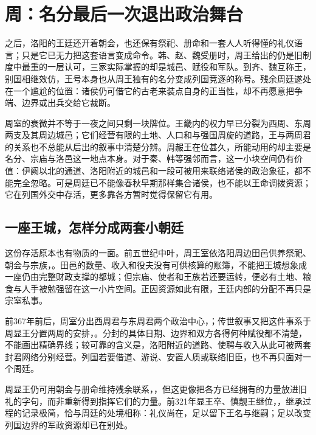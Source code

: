 \section{周：名分最后一次退出政治舞台}

之后，洛阳的王廷还开着朝会，也还保有祭祀、册命和一套人人听得懂的礼仪语言；只是它已无力把这套语言变成命令。韩、赵、魏受册时，周王给出的仍是旧制度中最重的一层认可，三家实际掌握的却是城邑、赋役和军队。到齐、魏互称王，别国相继效仿，王号本身也从周王独有的名分变成列国竞逐的称号。残余周廷遂处在一个尴尬的位置：诸侯仍可借它的古老来装点自身的正当性，却不再愿意把争端、边界或出兵交给它裁断。

周室的衰微并不等于一夜之间只剩一块牌位。王畿内的权力早已分裂为西周、东周两支及其周边城邑；它们经营有限的土地、人口和与强国周旋的道路，王与两周君的关系也不总能从后出的叙事中清楚分辨。周赧王在位甚久，所能动用的却主要是名分、宗庙与洛邑这一地点本身。对于秦、韩等强邻而言，这一小块空间仍有价值：伊阙以北的通道、洛阳附近的城邑和一段可被用来联络诸侯的政治象征，都不能完全忽略。可是周廷已不能像春秋早期那样集合诸侯，也不能以王命调拨资源；它在列国外交中存活，更多靠各方暂时觉得保留它有用。

\subsection{一座王城，怎样分成两套小朝廷}

这份存活原本也有物质的一面。前五世纪中叶，周王室依洛阳周边田邑供养祭祀、朝会与宗族，。田邑的数量、收入和役夫没有可供核算的账簿，不能把王城想象成一座仍由完整财政支撑的都城；但宗庙、使者和王族若还要运转，便必有土地、粮食与人手被勉强留在这一小片空间。正因资源如此有限，王廷内部的分配不再只是宗室私事。

前367年前后，周室分出西周君与东周君两个政治中心，；传世叙事又把这件事系于周显王分置两周的安排，。分封的具体日期、边界和双方各得何种赋役都不清楚，不能画出精确界线；较可靠的含义是，洛阳附近的道路、使聘与收入从此可被两套封君网络分别经营。列国若要借道、游说、安置人质或联络旧臣，也不再只面对一个周廷。

周显王仍可用朝会与册命维持残余联系，，但这更像把各方已经拥有的力量放进旧礼的字句，而非重新得到指挥它们的力量。前321年显王卒、慎靓王继位，，继承过程的记录极简，恰与周廷的处境相称：礼仪尚在，足以留下王名与继嗣；足以改变列国边界的军政资源却已在别处。

